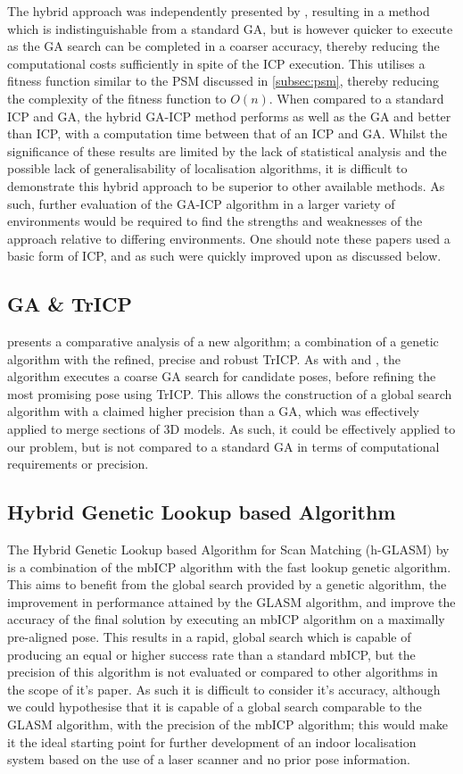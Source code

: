 \documentclass[authoryearcitations]{UoYCSproject}
\begin{document}
The hybrid approach was independently presented by \citet{Martinez2006-ci}, resulting in a method which is indistinguishable from a standard GA, but is however quicker to execute as the GA search can be completed in a coarser accuracy, thereby reducing the computational costs sufficiently in spite of the ICP execution. This utilises a fitness function similar to the PSM discussed in \ref{subsec:psm}, thereby reducing the complexity of the fitness function to $O(n)$. When compared to a standard ICP and GA, the hybrid GA-ICP method performs as well as the GA and better than ICP, with a computation time between that of an ICP and GA. Whilst the significance of these results are limited by the lack of statistical analysis and the possible lack of generalisability of localisation algorithms, it is difficult to demonstrate this hybrid approach to be superior to other available methods. As such, further evaluation of the GA-ICP algorithm in a larger variety of environments would be required to find the strengths and weaknesses of the approach relative to differing environments. One should note these papers used a basic form of ICP, and as such were quickly improved upon as discussed below.


\subsection{GA \& TrICP}
\citet{Lomonosov2006-vq} presents a comparative analysis of a new algorithm; a combination of a genetic algorithm with the refined, precise and robust TrICP. As with \cite{Brunnstrom1996-vo} and \cite{Martinez2006-ci}, the algorithm executes a coarse GA search for candidate poses, before refining the most promising pose using TrICP. This allows the construction of a global search algorithm with a claimed higher precision than a GA, which was effectively applied to merge sections of 3D models. As such, it could be effectively applied to our problem, but is not compared to a standard GA in terms of computational requirements or precision. 

\subsection{Hybrid Genetic Lookup based Algorithm}
The Hybrid Genetic Lookup based Algorithm for Scan Matching (h-GLASM) by \citet{Lenac2011-co} is a combination of the mbICP algorithm with the fast lookup genetic algorithm. This aims to benefit from the global search provided by a genetic algorithm, the improvement in performance attained by the GLASM algorithm, and improve the accuracy of the final solution by executing an mbICP algorithm on a maximally pre-aligned pose. This results in a rapid, global search which is capable of producing an equal or higher success rate than a standard mbICP, but the precision of this algorithm is not evaluated or compared to other algorithms in the scope of it's paper. As such it is difficult to consider it's accuracy, although we could hypothesise that it is capable of a global search comparable to the GLASM algorithm, with the precision of the mbICP algorithm; this would make it the ideal starting point for further development of an indoor localisation system based on the use of a laser scanner and no prior pose information.
\end{document}
